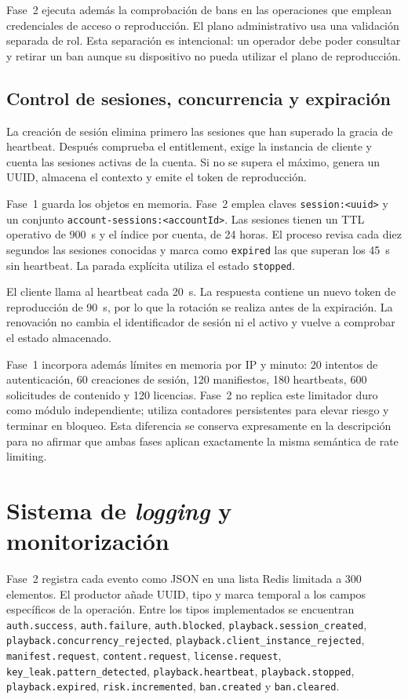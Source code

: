 Fase~2 ejecuta además la comprobación de bans en las operaciones que emplean credenciales de acceso o reproducción. El plano administrativo usa una validación separada de rol. Esta separación es intencional: un operador debe poder consultar y retirar un ban aunque su dispositivo no pueda utilizar el plano de reproducción.

\subsection{Control de sesiones, concurrencia y expiración}

La creación de sesión elimina primero las sesiones que han superado la gracia de heartbeat. Después comprueba el entitlement, exige la instancia de cliente y cuenta las sesiones activas de la cuenta. Si no se supera el máximo, genera un UUID, almacena el contexto y emite el token de reproducción.

Fase~1 guarda los objetos en memoria. Fase~2 emplea claves \nolinkurl{session:<uuid>} y un conjunto \nolinkurl{account-sessions:<accountId>}. Las sesiones tienen un TTL operativo de 900~s y el índice por cuenta, de 24 horas. El proceso revisa cada diez segundos las sesiones conocidas y marca como \nolinkurl{expired} las que superan los 45~s sin heartbeat. La parada explícita utiliza el estado \nolinkurl{stopped}.

El cliente llama al heartbeat cada 20~s. La respuesta contiene un nuevo token de reproducción de 90~s, por lo que la rotación se realiza antes de la expiración. La renovación no cambia el identificador de sesión ni el activo y vuelve a comprobar el estado almacenado.

Fase~1 incorpora además límites en memoria por IP y minuto: 20 intentos de autenticación, 60 creaciones de sesión, 120 manifiestos, 180 heartbeats, 600 solicitudes de contenido y 120 licencias. Fase~2 no replica este limitador duro como módulo independiente; utiliza contadores persistentes para elevar riesgo y terminar en bloqueo. Esta diferencia se conserva expresamente en la descripción para no afirmar que ambas fases aplican exactamente la misma semántica de rate limiting.

\section{Sistema de \textit{logging} y monitorización}

Fase~2 registra cada evento como JSON en una lista Redis limitada a 300 elementos. El productor añade UUID, tipo y marca temporal a los campos específicos de la operación. Entre los tipos implementados se encuentran \nolinkurl{auth.success}, \nolinkurl{auth.failure}, \nolinkurl{auth.blocked}, \nolinkurl{playback.session_created}, \nolinkurl{playback.concurrency_rejected}, \nolinkurl{playback.client_instance_rejected}, \nolinkurl{manifest.request}, \nolinkurl{content.request}, \nolinkurl{license.request}, \nolinkurl{key_leak.pattern_detected}, \nolinkurl{playback.heartbeat}, \nolinkurl{playback.stopped}, \nolinkurl{playback.expired}, \nolinkurl{risk.incremented}, \nolinkurl{ban.created} y \nolinkurl{ban.cleared}.

